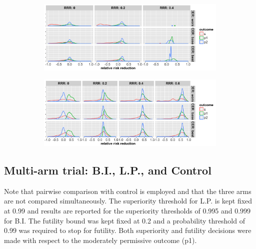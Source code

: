 \documentclass[]{article}
\begin{document}
\begin{figure}
\centering
  \caption{Distribution of relative risk reduction estimates after stopping early for (a) futility; (b) superiority.
  Results are presented for the three control event rates by rows, four relative risk reductions (by columns) and the
  three outcomes (legend).}
  \begin{subfigure}{0.8\textwidth}
    \centering
    \caption{}
    \includegraphics{../plots/stop_p1_new/RRRhat_fut_sim_05_stopp1_new.png}
  \end{subfigure}
  \bigbreak
  \begin{subfigure}{0.8\textwidth}
    \centering
    \caption{}
    \includegraphics{../plots/stop_p1_new/RRRhat_sup_sim_05_stopp1_new.png}
  \end{subfigure}
\end{figure}

\hypertarget{multi-arm-trial-b.i.-l.p.-and-control}{%
\subsection{Multi-arm trial: B.I., L.P., and
Control}\label{multi-arm-trial-b.i.-l.p.-and-control}}

Note that pairwise comparison with control is employed and that the
three arms are not compared simultaneously. The superiority threshold
for L.P. is kept fixed at 0.99 and results are reported for the
superiority thresholds of 0.995 and 0.999 for B.I. The futility bound
was kept fixed at 0.2 and a probability threshold of 0.99 was required
to stop for futility. Both superiority and futility decisions were made
with respect to the moderately permissive outcome (p1).
\end{document}
